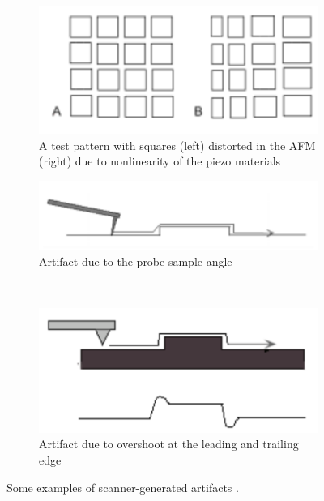 \documentclass[11pt,a4paper]{article}
\begin{document}
\begin{figure}[H]
\centering
\begin{subfigure}[b]{0.45\textwidth}
\includegraphics[width=\textwidth]{artifacts_scanner_1}
\caption{A test pattern with squares (left) distorted in the AFM (right) due to nonlinearity of the piezo materials}
\label{fig:artifacts_scanner_1}
\end{subfigure}
\begin{subfigure}[b]{0.45\textwidth}
\includegraphics[width=\textwidth]{artifacts_scanner_2}
\caption{Artifact due to the probe sample angle}
\label{fig:artifacts_scanner_2}
\end{subfigure}\\\vspace{.2cm}
\begin{subfigure}[b]{0.45\textwidth}
\includegraphics[width=\textwidth]{artifacts_scanner_3}
\caption{Artifact due to overshoot at the leading and trailing edge}
\label{fig:artifacts_scanner_3}
\end{subfigure}
\caption{Some examples of scanner-generated artifacts \cite{artifacts}.}
\label{fig:artifacts_scanner}
\end{figure}
\end{document}
